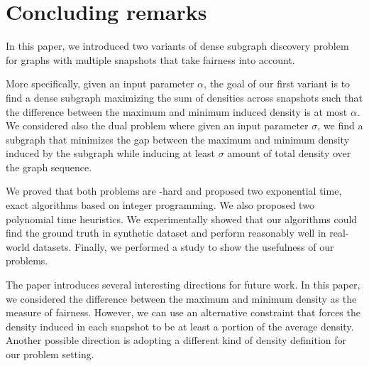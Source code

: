 \section{Concluding remarks}\label{sec:conclusions}

In this paper, we introduced two variants of dense subgraph discovery problem for graphs with multiple snapshots that take fairness into account. 

More specifically,
given an input parameter $\alpha$, the goal of our first variant is to find a dense subgraph maximizing the sum of densities across snapshots such that the difference between the maximum and minimum induced density is at most $\alpha$. 
We considered also the dual problem where given an input parameter $\sigma$, we find a subgraph that minimizes the gap between the maximum and minimum density induced by the subgraph while inducing at least $\sigma$ amount of total density over the graph sequence.

We proved that both problems are \np-hard and proposed two exponential time, exact algorithms based on integer programming.
We also proposed two polynomial time heuristics.
We experimentally showed that our
algorithms could find the ground truth in synthetic dataset and perform reasonably well in real-world datasets.
Finally, we performed a study to show the usefulness of our problems.

The paper introduces several interesting directions for future work.  In this
paper, we considered the difference between the maximum and minimum density as the measure of fairness.
However, we can use an alternative constraint that forces the density induced in each snapshot to be at least a portion of the average density.
Another possible
direction is adopting a different kind of density definition for our problem setting.
